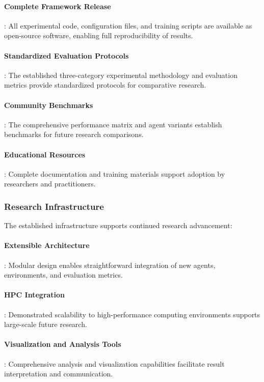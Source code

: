 \documentclass[12pt,oneside]{article}
\begin{document}
\paragraph{Complete Framework Release}: All experimental code, configuration files, and training scripts are available as open-source software, enabling full reproducibility of results.

\paragraph{Standardized Evaluation Protocols}: The established three-category experimental methodology and evaluation metrics provide standardized protocols for comparative research.

\paragraph{Community Benchmarks}: The comprehensive performance matrix and agent variants establish benchmarks for future research comparisons.

\paragraph{Educational Resources}: Complete documentation and training materials support adoption by researchers and practitioners.

\subsubsection{Research Infrastructure}
The established infrastructure supports continued research advancement:

\paragraph{Extensible Architecture}: Modular design enables straightforward integration of new agents, environments, and evaluation metrics.

\paragraph{HPC Integration}: Demonstrated scalability to high-performance computing environments supports large-scale future research.

\paragraph{Visualization and Analysis Tools}: Comprehensive analysis and visualization capabilities facilitate result interpretation and communication.
\end{document}
